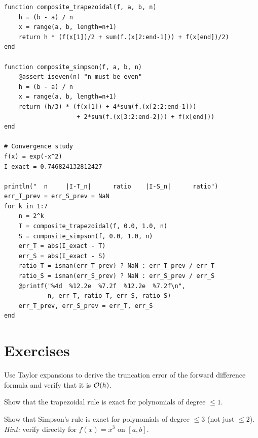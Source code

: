 \begin{codeblock}[title=\textbf{Julia --- Numerical integration}]
\begin{verbatim}
function composite_trapezoidal(f, a, b, n)
    h = (b - a) / n
    x = range(a, b, length=n+1)
    return h * (f(x[1])/2 + sum(f.(x[2:end-1])) + f(x[end])/2)
end

function composite_simpson(f, a, b, n)
    @assert iseven(n) "n must be even"
    h = (b - a) / n
    x = range(a, b, length=n+1)
    return (h/3) * (f(x[1]) + 4*sum(f.(x[2:2:end-1]))
                    + 2*sum(f.(x[3:2:end-2])) + f(x[end]))
end

# Convergence study
f(x) = exp(-x^2)
I_exact = 0.746824132812427

println("  n     |I-T_n|      ratio    |I-S_n|      ratio")
err_T_prev = err_S_prev = NaN
for k in 1:7
    n = 2^k
    T = composite_trapezoidal(f, 0.0, 1.0, n)
    S = composite_simpson(f, 0.0, 1.0, n)
    err_T = abs(I_exact - T)
    err_S = abs(I_exact - S)
    ratio_T = isnan(err_T_prev) ? NaN : err_T_prev / err_T
    ratio_S = isnan(err_S_prev) ? NaN : err_S_prev / err_S
    @printf("%4d  %12.2e  %7.2f  %12.2e  %7.2f\n",
            n, err_T, ratio_T, err_S, ratio_S)
    err_T_prev, err_S_prev = err_T, err_S
end
\end{verbatim}
\end{codeblock}

\section{Exercises}

\begin{exercise}[$\star$]
\label{ex:ch7-fd-order}
Use Taylor expansions to derive the truncation error of the forward difference formula and verify that it is $\mathcal{O}(h)$.
\end{exercise}

\begin{exercise}[$\star$]
\label{ex:ch7-trap-exact}
Show that the trapezoidal rule is exact for polynomials of degree $\leq 1$.
\end{exercise}

\begin{exercise}[$\star\star$]
\label{ex:ch7-simpson-exact}
Show that Simpson's rule is exact for polynomials of degree $\leq 3$ (not just $\leq 2$).
\textit{Hint:} verify directly for $f(x) = x^3$ on $[a,b]$.
\end{exercise}

